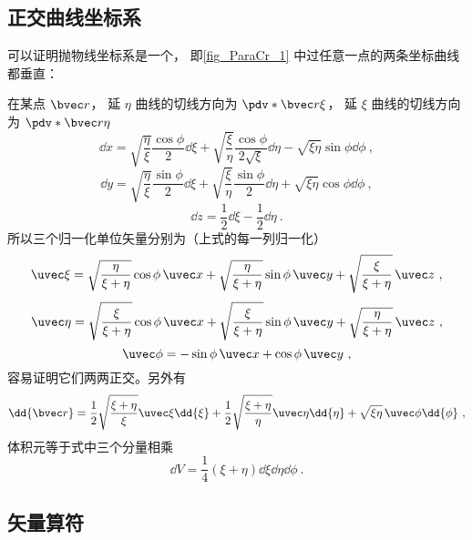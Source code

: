
\subsection{正交曲线坐标系}
可以证明抛物线坐标系是一个， 即\autoref{fig_ParaCr_1} 中过任意一点的两条坐标曲线都垂直：

在某点 $\bvec r$， 延 $\eta$ 曲线的切线方向为 $\pdv*{\bvec r}{\xi}$， 延 $\xi$ 曲线的切线方向为 $\pdv*{\bvec r}{\eta}$
\begin{equation}
\dd{x} = \sqrt{\frac{\eta}{\xi}}\frac{\cos\phi}{2}\dd{\xi} + \sqrt{\frac{\xi}{\eta}}\frac{\cos\phi}{2\sqrt{\xi}}\dd{\eta} - \sqrt{\xi\eta}\sin\phi\dd{\phi}~,
\end{equation}
\begin{equation}
\dd{y} = \sqrt{\frac{\eta}{\xi}}\frac{\sin\phi}{2}\dd{\xi} + \sqrt{\frac{\xi}{\eta}}\frac{\sin\phi}{2}\dd{\eta} + \sqrt{\xi\eta}\cos\phi\dd{\phi}~,
\end{equation}
\begin{equation}
\dd{z} = \frac{1}{2}\dd{\xi} - \frac{1}{2}\dd{\eta}~.
\end{equation}
所以三个归一化单位矢量分别为（上式的每一列归一化）
\begin{equation}
\uvec \xi = \sqrt{\frac{\eta}{\xi+\eta}}\cos\phi\,\uvec x + \sqrt{\frac{\eta}{\xi+\eta}}\sin\phi\,\uvec y + \sqrt{\frac{\xi}{\xi+\eta}}\,\uvec z~,
\end{equation}
\begin{equation}
\uvec \eta = \sqrt{\frac{\xi}{\xi+\eta}}\cos\phi\,\uvec x + \sqrt{\frac{\xi}{\xi+\eta}}\sin\phi\,\uvec y + \sqrt{\frac{\eta}{\xi+\eta}}\,\uvec z~,
\end{equation}
\begin{equation}
\uvec \phi = -\sin\phi \,\uvec x + \cos\phi \,\uvec y~,
\end{equation}
容易证明它们两两正交。另外有
\begin{equation}\label{eq_ParaCr_4}
\dd{\bvec r} = \frac{1}{2}\sqrt{\frac{\xi + \eta}{\xi}} \uvec \xi \dd{\xi}
+ \frac{1}{2}\sqrt{\frac{\xi + \eta}{\eta}} \uvec \eta \dd{\eta}
+ \sqrt{\xi\eta}\, \uvec \phi \dd{\phi}~,
\end{equation}
体积元等于式中三个分量相乘
\begin{equation}
\dd{V} = \frac{1}{4} (\xi + \eta) \dd{\xi}\dd{\eta}\dd{\phi}~.
\end{equation}

\subsection{矢量算符}

